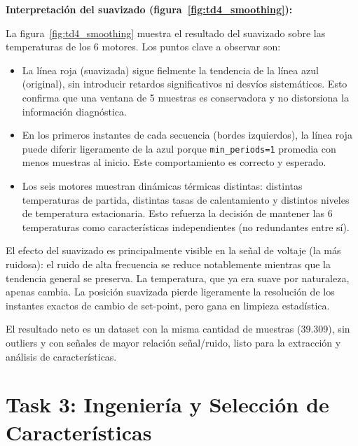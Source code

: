 \documentclass[12pt,a4paper]{article}
\begin{document}
\textbf{Interpretación del suavizado (figura~\ref{fig:td4_smoothing}):}

La figura~\ref{fig:td4_smoothing} muestra el resultado del suavizado sobre las
temperaturas de los 6 motores. Los puntos clave a observar son:

\begin{itemize}[leftmargin=2em]
  \item La línea roja (suavizada) sigue fielmente la tendencia de la línea azul
    (original), sin introducir retardos significativos ni desvíos sistemáticos.
    Esto confirma que una ventana de 5 muestras es conservadora y no distorsiona
    la información diagnóstica.

  \item En los primeros instantes de cada secuencia (bordes izquierdos), la línea
    roja puede diferir ligeramente de la azul porque \texttt{min\_periods=1} promedia
    con menos muestras al inicio. Este comportamiento es correcto y esperado.

  \item Los seis motores muestran dinámicas térmicas distintas: distintas temperaturas
    de partida, distintas tasas de calentamiento y distintos niveles de temperatura
    estacionaria. Esto refuerza la decisión de mantener las 6 temperaturas como
    características independientes (no redundantes entre sí).
\end{itemize}

\begin{resultbox}
El efecto del suavizado es principalmente visible en la señal de voltaje
(la más ruidosa): el ruido de alta frecuencia se reduce notablemente
mientras que la tendencia general se preserva. La temperatura, que ya era
suave por naturaleza, apenas cambia. La posición suavizada pierde ligeramente
la resolución de los instantes exactos de cambio de set-point, pero gana
en limpieza estadística.

El resultado neto es un dataset con la misma cantidad de muestras (39.309),
sin outliers y con señales de mayor relación señal/ruido, listo para la
extracción y análisis de características.
\end{resultbox}

\section{Task 3: Ingeniería y Selección de Características}
\end{document}
